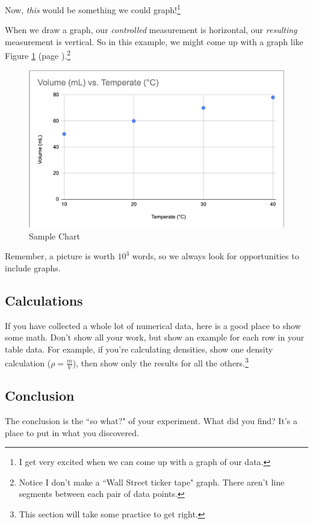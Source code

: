 \documentclass[12pt, oneside]{article}   	%
\begin{document}
Now, \emph{this} would be something we could graph!\footnote{I get very excited when we can come up with a graph of our data.}

When we draw a graph, our \emph{controlled} measurement is horizontal, our \emph{resulting} measurement is vertical.
So in this example, we might come up with a graph like Figure \ref{figure:sampleChart} (page  \pageref{figure:sampleChart}).\footnote{Notice I don't make a ``Wall Street ticker tape" graph. There aren't line segments between each pair of data points.}

\begin{figure}[p]
\includegraphics[scale=0.75]{Sample_Chem_Chart.png}
 \caption{Sample Chart}
 \label{figure:sampleChart}
 \end{figure}  

Remember, a picture is worth $10^3$ words, so we always look for opportunities to include graphs.


\subsection{Calculations}
If you have collected a whole lot of numerical data, here is a good place to show some math. Don't show all your work, but show an example for each row in your table data. For example, if you're calculating densities, show one density calculation ($\rho = \frac{m}{V}$), then show only the results for all the others.\footnote{This section will take some practice to get right.}

\subsection{Conclusion}
The conclusion is the ``so what?" of your experiment. What did you find? It's a place to put in what you discovered.
\end{document}
